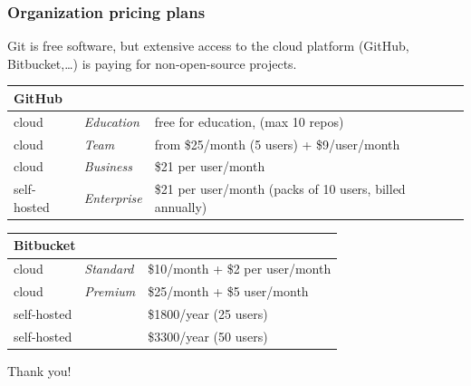 \documentclass[10pt,svgnames,handout]{beamer}
\begin{document}
\begin{frame}
\frametitle{Organization pricing plans}

Git is free software, but extensive access to the cloud platform (GitHub, Bitbucket,\ldots) is paying for non-open-source projects.

\small

\begin{tabular}{llp{6cm}}
\multicolumn{3}{l}{\textbf{GitHub}}\\
\toprule
cloud       & \emph{Education}  & free for education, (max 10 repos)                       \\
cloud       & \emph{Team}       & from \$25/month (5 users) + \$9/user/month               \\
cloud       & \emph{Business}   & \$21 per user/month                                      \\
\midrule
self-hosted & \emph{Enterprise} & \$21 per user/month (packs of 10 users, billed annually) \\
\bottomrule
\end{tabular}

\medskip

\begin{tabular}{lll}
\multicolumn{3}{l}{\textbf{Bitbucket}}\\
\toprule
cloud       & \emph{Standard} & \$10/month + \$2 per user/month \\
cloud       & \emph{Premium}  & \$25/month + \$5 user/month     \\
\midrule
self-hosted &                 & \$1800/year (25 users)          \\
self-hosted &                 & \$3300/year (50 users)          \\
\bottomrule
\end{tabular}
\end{frame}


\begin{frame}[standout]
Thank you!
\end{frame}


\appendix
\end{document}
